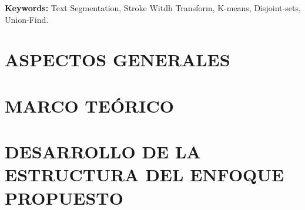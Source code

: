 \documentclass[12pt,oneside,a4paper]{book}
\theoremstyle{definition}
\renewcommand{\chaptermark}[1]{\markboth{\MakeUppercase{#1}}{}}
\begin{document}
\noindent \textbf{Keywords:} Text Segmentation, Stroke Witdh Transform, 
K-means, Disjoint-sets, Union-Find.

\tableofcontents    %

\renewcommand\listtablename{ÍNDICE DE TABLAS}
\renewcommand\listfigurename{ÍNDICE DE FIGURAS}
\listoftables
\listoffigures

\mainmatter

\fancyhead[RE,LO]{\thesection}

\onehalfspacing            %


\part{ASPECTOS GENERALES}


\part{MARCO TEÓRICO}




\part{DESARROLLO DE LA ESTRUCTURA DEL ENFOQUE PROPUESTO}
  







\renewcommand\bibname{BIBLIOGRAFÍA}
\backmatter \singlespacing   %

\renewcommand{\appendixname}{Anexo}
\renewcommand{\appendixtocname}{ANEXOS}
\renewcommand{\appendixpagename}{ANEXOS}
\renewcommand{\chaptermark}[1]{\markboth{\MakeUppercase{\appendixname\ \thechapter}} {\MakeUppercase{#1}} }
\fancyhead[RE,LO]{}
\appendix
\clearpage
\addappheadtotoc
\appendixpage


\end{document}
